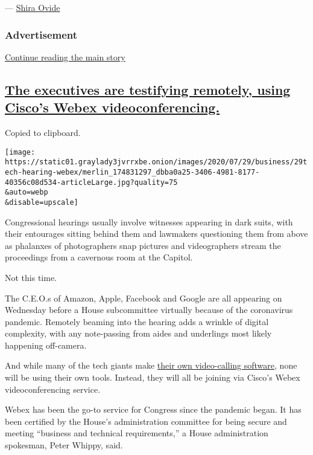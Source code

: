 --- \href{https://www.nytimes3xbfgragh.onion/by/shira-ovide}{Shira
Ovide}

\hypertarget{advertisement-3}{%
\subsubsection{Advertisement}\label{advertisement-3}}

\protect\hyperlink{after-dfp-ad-mid1}{Continue reading the main story}

\hypertarget{the-executives-are-testifying-remotely-using-ciscos-webex-videoconferencing}{%
\subsection{\texorpdfstring{\protect\hyperlink{the-executives-are-testifying-remotely-using-ciscos-webex-videoconferencing}{The
executives are testifying remotely, using Cisco's Webex
videoconferencing.}}{The executives are testifying remotely, using Cisco's Webex videoconferencing.}}\label{the-executives-are-testifying-remotely-using-ciscos-webex-videoconferencing}}

Copied to clipboard.

\texttt{[image: https://static01.graylady3jvrrxbe.onion/images/2020/07/29/business/29tech-hearing-webex/merlin\_174831297\_dbba0a25-3406-4981-8177-40356c08d534-articleLarge.jpg?quality=75\\\&auto=webp\\\&disable=upscale]}

Congressional hearings usually involve witnesses appearing in dark
suits, with their entourages sitting behind them and lawmakers
questioning them from above as phalanxes of photographers snap pictures
and videographers stream the proceedings from a cavernous room at the
Capitol.

Not this time.

The C.E.O.s of Amazon, Apple, Facebook and Google are all appearing on
Wednesday before a House subcommittee virtually because of the
coronavirus pandemic. Remotely beaming into the hearing adds a wrinkle
of digital complexity, with any note-passing from aides and underlings
most likely happening off-camera.

And while many of the tech giants make
\href{https://www.nytimes3xbfgragh.onion/2020/04/24/technology/zoom-rivals-virus-facebook-google.html}{their
own video-calling software}, none will be using their own tools.
Instead, they will all be joining via Cisco's Webex videoconferencing
service.

Webex has been the go-to service for Congress since the pandemic began.
It has been certified by the House's administration committee for being
secure and meeting ``business and technical requirements,'' a House
administration spokesman, Peter Whippy, said.

